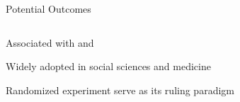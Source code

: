 \documentclass[notes,11pt, aspectratio=169, usenames, dvipsnames]{beamer}
\newenvironment{wideitemize}{\itemize\addtolength{\itemsep}{10pt}}{\enditemize}
\begin{document}
\begin{frame}{Potential Outcomes}
	\begin{columns}[c]
		\begin{column}{0.58\textwidth}
			\begin{wideitemize}
				\item Associated with \citet{Neyman1923} and \citet{Rubin1974}
				\item Widely adopted in social sciences and medicine
				\item Randomized experiment serve as its ruling paradigm
			\end{wideitemize}
		\end{column}
		\hfill%
		\begin{column}{0.4\textwidth}
		\end{column}
	\end{columns}
\end{frame}
\end{document}
